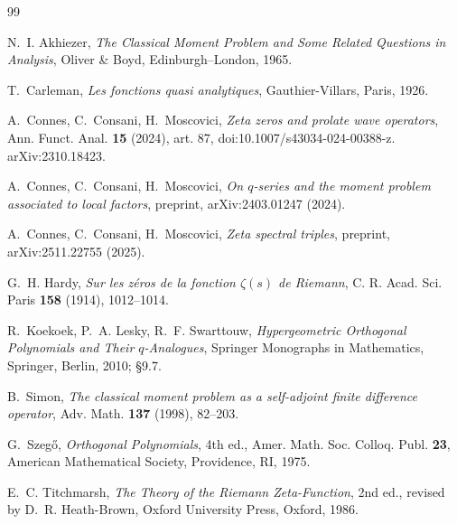 \documentclass[11pt]{amsart}
\theoremstyle{definition}
\theoremstyle{remark}
\begin{document}
\begin{thebibliography}{99}

N.~I. Akhiezer,
\emph{The Classical Moment Problem and Some Related Questions in Analysis},
Oliver \& Boyd, Edinburgh--London, 1965.

T.~Carleman,
\emph{Les fonctions quasi analytiques},
Gauthier-Villars, Paris, 1926.

A.~Connes, C.~Consani, H.~Moscovici,
\emph{Zeta zeros and prolate wave operators},
Ann. Funct. Anal. \textbf{15} (2024), art. 87,
doi:10.1007/s43034-024-00388-z.
arXiv:2310.18423.

A.~Connes, C.~Consani, H.~Moscovici,
\emph{On $q$-series and the moment problem associated to local factors},
preprint, arXiv:2403.01247 (2024).

A.~Connes, C.~Consani, H.~Moscovici,
\emph{Zeta spectral triples},
preprint, arXiv:2511.22755 (2025).

G.~H. Hardy,
\emph{Sur les z\'eros de la fonction $\zeta(s)$ de Riemann},
C. R. Acad. Sci. Paris \textbf{158} (1914), 1012--1014.

R.~Koekoek, P.~A. Lesky, R.~F. Swarttouw,
\emph{Hypergeometric Orthogonal Polynomials and Their $q$-Analogues},
Springer Monographs in Mathematics, Springer, Berlin, 2010; \S9.7.

B.~Simon,
\emph{The classical moment problem as a self-adjoint finite difference
operator},
Adv. Math. \textbf{137} (1998), 82--203.

G.~Szeg\H{o},
\emph{Orthogonal Polynomials},
4th ed., Amer. Math. Soc. Colloq. Publ. \textbf{23},
American Mathematical Society, Providence, RI, 1975.

E.~C. Titchmarsh,
\emph{The Theory of the Riemann Zeta-Function},
2nd ed., revised by D.~R. Heath-Brown,
Oxford University Press, Oxford, 1986.

\end{thebibliography}
\end{document}

